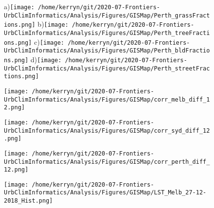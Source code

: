 \documentclass{article}
\begin{document}
\begin{figure} %
\centering    
{\tiny a)}\texttt{[image: /home/kerryn/git/2020-07-Frontiers-UrbClimInformatics/Analysis/Figures/GISMap/Perth\_grassFractions.png]}
{\tiny b)}\texttt{[image: /home/kerryn/git/2020-07-Frontiers-UrbClimInformatics/Analysis/Figures/GISMap/Perth\_treeFractions.png]}
{\tiny c)}\texttt{[image: /home/kerryn/git/2020-07-Frontiers-UrbClimInformatics/Analysis/Figures/GISMap/Perth\_bldFractions.png]}
{\tiny d)}\texttt{[image: /home/kerryn/git/2020-07-Frontiers-UrbClimInformatics/Analysis/Figures/GISMap/Perth\_streetFractions.png]}
\end{figure} 
\clearpage




\begin{figure} %
\texttt{[image: /home/kerryn/git/2020-07-Frontiers-UrbClimInformatics/Analysis/Figures/GISMap/corr\_melb\_diff\_12.png]}
\end{figure} 
\clearpage

\begin{figure} %
\texttt{[image: /home/kerryn/git/2020-07-Frontiers-UrbClimInformatics/Analysis/Figures/GISMap/corr\_syd\_diff\_12.png]}
\end{figure} 
\clearpage

\begin{figure} %
\texttt{[image: /home/kerryn/git/2020-07-Frontiers-UrbClimInformatics/Analysis/Figures/GISMap/corr\_perth\_diff\_12.png]}
\end{figure} 
\clearpage


\begin{figure} %
\texttt{[image: /home/kerryn/git/2020-07-Frontiers-UrbClimInformatics/Analysis/Figures/GISMap/LST\_Melb\_27-12-2018\_Hist.png]}
\end{figure} 
\clearpage
\end{document}

